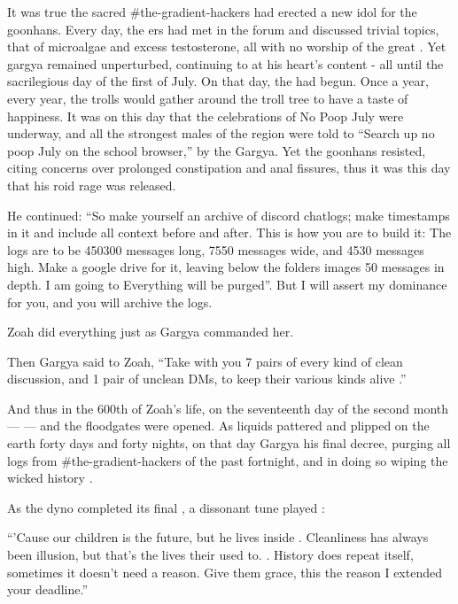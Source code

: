 \documentclass{article}
\begin{document}
It was true  the sacred \#the-gradient-hackers had erected a new idol for the goonhans. Every day, the ers had met in the forum and discussed trivial topics, that of microalgae and excess testosterone, all with no worship of the great . Yet gargya remained unperturbed, continuing to  at his heart's content - all until the sacrilegious day of the first of July. On that day, the  had begun. Once a year, every year, the trolls would gather around the troll tree to have a taste of happiness. It was on this day that the celebrations of No Poop July were underway, and all the strongest males of the region were told to “Search up no poop July on the school browser,” by the Gargya. Yet the goonhans resisted, citing concerns over prolonged constipation and anal fissures, thus it was this day that his roid rage was released.

He continued: “So make yourself an archive of discord chatlogs; make timestamps in it and include all context before and after. This is how you are to build it: The logs are to be 450300 messages long, 7550 messages wide, and 4530 messages high. Make a google drive for it, leaving below the folders images 50 messages in depth. I am going to  Everything  will be purged”. But I will assert my dominance for you, and you will archive the logs.

Zoah did everything just as Gargya commanded her.

Then Gargya said to Zoah, “Take with you 7 pairs of every kind of clean discussion, and 1 pair of unclean DMs, to keep their various kinds alive .”

And thus in the 600th  of Zoah's life, on the seventeenth day of the second month ---  --- and the floodgates  were opened. As liquids pattered and plipped on the earth forty days and forty nights, on that day Gargya  his final decree, purging all logs from \#the-gradient-hackers of the past fortnight, and in doing so wiping the wicked history .

As the dyno completed its final , a dissonant tune played :

“'Cause our children is the future, but he lives inside . Cleanliness has always been illusion, but that's the lives their used to. . History does repeat itself, sometimes it doesn't need a reason. Give them grace, this the reason I extended your deadline.”
\end{document}
